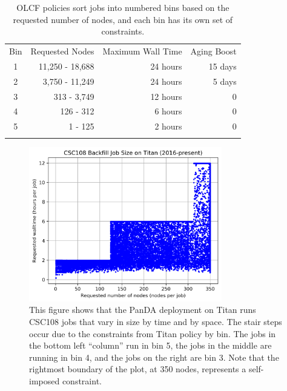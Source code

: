 \begin{table}
\caption{OLCF policies sort jobs into numbered bins based on the requested
number of nodes, and each bin has its own set of constraints.}
\label{tab:olcfbins}       %
\begin{tabular}{crrr}
\hline\noalign{\smallskip}
Bin & Requested Nodes   & Maximum Wall Time &   Aging Boost \\
\noalign{\smallskip}\hline\noalign{\smallskip}
1   &   11,250 - 18,688 &   24 hours        &   15 days     \\
2   &    3,750 - 11,249 &   24 hours        &    5 days     \\
3   &       313 - 3,749 &   12 hours        &         0     \\
4   &         126 - 312 &    6 hours        &         0     \\
5   &           1 - 125 &    2 hours        &         0     \\
\noalign{\smallskip}\hline
\end{tabular}
\end{table}


\begin{figure}
  \includegraphics[width=0.75\textwidth]{images/time-vs-nodes-backfill.png}
\caption{This figure shows that the PanDA deployment on Titan runs CSC108 jobs
that vary in size by time and by space. The stair steps occur due to the
constraints from Titan policy by bin. The jobs in the bottom left ``column''
run in bin 5, the jobs in the middle are running in bin 4, and the jobs on the
right are bin 3. Note that the rightmost boundary of the plot, at 350 nodes,
represents a self-imposed constraint.}
\label{fig:time-vs-nodes}
\end{figure}

